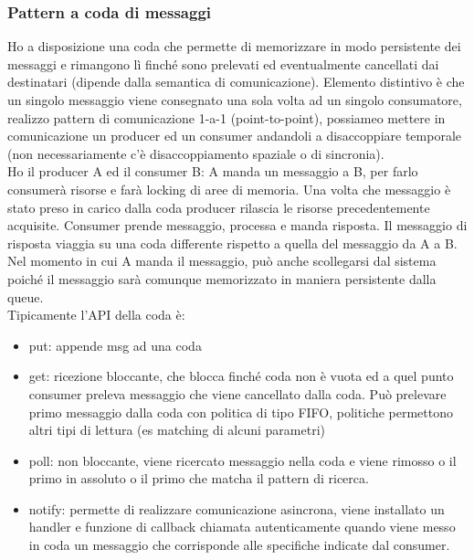 \documentclass[16px]{article}
\begin{document}
\subsubsection{Pattern a coda di messaggi}
Ho a disposizione una coda che permette di memorizzare in modo persistente dei messaggi e rimangono lì finché sono prelevati ed eventualmente cancellati dai destinatari (dipende dalla semantica di comunicazione). Elemento distintivo è che un singolo messaggio viene consegnato una sola volta ad un singolo consumatore, realizzo pattern di comunicazione 1-a-1 (point-to-point), possiameo mettere in comunicazione un producer ed un consumer andandoli a disaccoppiare temporale (non necessariamente c'è disaccoppiamento spaziale o di sincronia).\\ Ho il producer A ed il consumer B: A manda un messaggio a B, per farlo consumerà risorse e farà locking di aree di memoria. Una volta che messaggio è stato preso in carico dalla coda producer  rilascia le risorse precedentemente acquisite. Consumer prende messaggio, processa e manda risposta. Il messaggio di risposta viaggia su una coda differente rispetto a quella del messaggio da A a B.\\ Nel momento in cui A manda il messaggio, può anche scollegarsi dal sistema poiché il messaggio sarà comunque memorizzato in maniera persistente dalla queue.\\ Tipicamente l'API della coda è:
\begin{itemize}
\item put: appende msg ad una coda
\item get: ricezione bloccante, che blocca finché coda non è vuota ed a quel punto consumer preleva messaggio che viene cancellato dalla coda. Può prelevare primo messaggio dalla coda con politica di tipo FIFO, politiche permettono altri tipi di lettura (es matching di alcuni parametri)
\item poll: non bloccante, viene ricercato messaggio nella coda e viene rimosso o il primo in assoluto o il primo che matcha il pattern di ricerca.
\item notify: permette di realizzare comunicazione asincrona, viene installato un handler e funzione di callback chiamata autenticamente quando viene messo in coda un messaggio che corrisponde alle specifiche indicate dal consumer.
\end{itemize}
\end{document}
